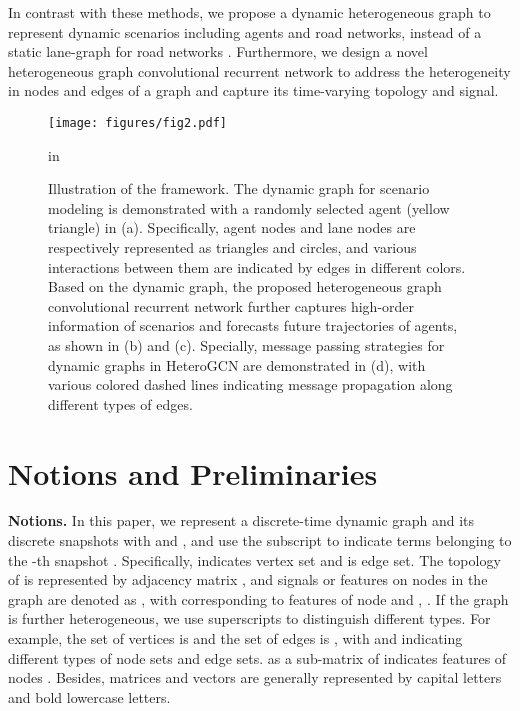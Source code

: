 \documentclass[letterpaper, 10 pt, conference]{ieeeconf}
\begin{document}
In contrast with these methods, we propose a  dynamic heterogeneous graph to represent dynamic scenarios including agents and road networks, instead of a static lane-graph for road networks \cite{liang2020learning,zeng2021lanercnn,gilles2021gohome}. Furthermore,  we design a novel  heterogeneous graph convolutional recurrent network to address the heterogeneity in nodes and edges of a graph and capture its time-varying topology and signal.

\begin{figure*}[tp]
\begin{center}
\centerline{\texttt{[image: figures/fig2.pdf]}}
\caption{Illustration of the framework. The dynamic graph for scenario modeling is demonstrated with a randomly selected agent (yellow triangle) in (a). Specifically, agent nodes and lane nodes are respectively represented as triangles and circles, and various interactions between them are indicated by edges in different colors. Based on the dynamic graph, the proposed heterogeneous graph convolutional recurrent network further captures high-order information of scenarios and forecasts future trajectories of agents, as shown in (b) and (c). Specially, message passing strategies for dynamic graphs in HeteroGCN are demonstrated in (d), with various colored dashed lines indicating message propagation along different types of edges.} \label{fig.1}
\label{fig:node_spec}
\end{center}
 in
\end{figure*}

\section{Notions and Preliminaries}
\textbf{Notions.} In this paper, we represent a discrete-time  dynamic graph and its discrete snapshots  with  and ,  and use the subscript  to indicate terms belonging to the -th snapshot . Specifically,  indicates vertex set and  is edge set. The topology of  is represented by adjacency matrix , and signals or features on nodes in the graph are denoted as , with  corresponding to features of node  and , . If the graph is further heterogeneous, we use superscripts to distinguish different types. For example, the set of vertices is  and the set of edges is , with  and  indicating different types of node sets and edge sets.   as a sub-matrix of  indicates features of nodes  . Besides, matrices and vectors are generally represented by capital letters and bold lowercase letters. 
\end{document}
